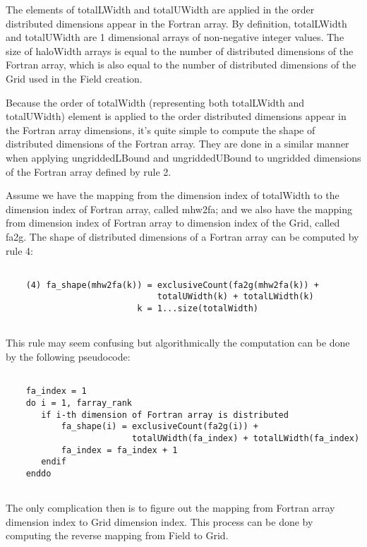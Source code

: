     The elements of totalLWidth and totalUWidth are applied in the order
    distributed dimensions appear in the Fortran array. By definition, 
    totalLWidth and totalUWidth are 1 dimensional arrays of non-negative 
    integer values. The size of haloWidth arrays is equal to the number of distributed
    dimensions of the Fortran array, which is also equal to the number of
    distributed dimensions of the Grid used in the Field creation.
  
    Because the order of totalWidth (representing both totalLWidth and
    totalUWidth) element is applied to the order distributed dimensions
    appear in the Fortran array dimensions, it's quite simple to compute
    the shape of distributed dimensions of the Fortran array. They are done
    in a similar manner when applying ungriddedLBound and ungriddedUBound 
    to ungridded dimensions of the Fortran array defined by rule 2.
  
    Assume we have the mapping from the dimension index of totalWidth
    to the dimension index of Fortran array, called mhw2fa; and we also
    have the mapping from dimension index of Fortran array to dimension
    index of the Grid, called fa2g. The shape of
    distributed dimensions of a Fortran array can be computed by rule 4: 
   
    \begin{verbatim}
  
    (4) fa_shape(mhw2fa(k)) = exclusiveCount(fa2g(mhw2fa(k)) + 
                              totalUWidth(k) + totalLWidth(k)
                          k = 1...size(totalWidth) 
  
    \end{verbatim}
    
    This rule may seem confusing but algorithmically the computation
    can be done by the following pseudocode:
  
    \begin{verbatim}
  
    fa_index = 1
    do i = 1, farray_rank
       if i-th dimension of Fortran array is distributed
           fa_shape(i) = exclusiveCount(fa2g(i)) + 
                         totalUWidth(fa_index) + totalLWidth(fa_index)
           fa_index = fa_index + 1
       endif
    enddo
  
    \end{verbatim}
  
    The only complication then is to figure out the mapping from Fortran
    array dimension index to Grid dimension index. This process can
    be done by computing the reverse mapping from Field to Grid.
  
